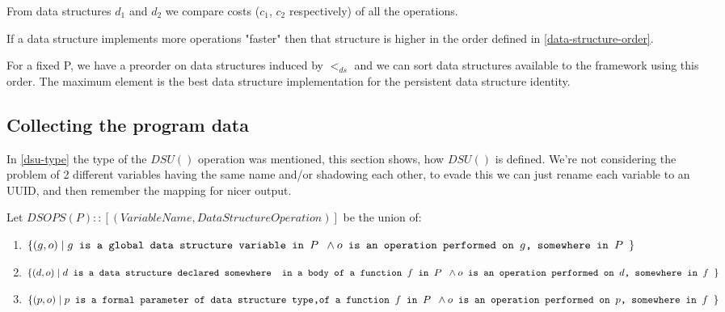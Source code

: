 \documentclass[a4paper,11pt]{article}
\begin{document}
        From data structures $d_1$ and $d_2$ we compare costs ($c_1$, $c_2$ respectively) of all the operations.

		If a data structure implements more operations "faster" then that structure is higher in the order defined
        in \autoref{data-structure-order}.

		For a fixed P, we have a preorder on data structures induced by $<_{ds}$ and we can sort data structures
		available to the framework using this order. The maximum element is the best data structure
		implementation for the persistent data structure identity.

	\subsection{Collecting the program data} \label{dsu-definition}

		In \autoref{dsu-type} the type of the $DSU()$ operation was mentioned, this section shows, how $DSU()$ is
		defined. We're not considering the problem of 2 different variables having the same name and/or shadowing each
        other, to evade this we can just rename each variable to an UUID, and then remember the mapping for nicer
        output.

		Let $DSOPS(P) :: [(VariableName, DataStructureOperation)]$ be the union of:
		\begin{enumerate}

			\item \label{it:global} $\{(g, o)\; |\; g \texttt{ is a global data structure variable in $P$ }
				\wedge \\ o \texttt{ is an operation performed on $g$, somewhere in $P$ } \}$

			\item \label{it:auto} $\{(d, o)\; |\; d \texttt{ is a data structure declared somewhere } \\
				\texttt{ in a body of a function $f$ in $P$ } \wedge \\ o \texttt{ is an operation
				performed on $d$, somewhere in $f$ } \}$

			\item \label{it:param} $\{(p, o)\; |\; p \texttt{ is a formal parameter of data structure type,}
				\\ \texttt{of a function $f$ in $P$ } \wedge \\ o \texttt{ is an operation performed on
				$p$, somewhere in $f$ } \}$

		\end{enumerate}
\end{document}
